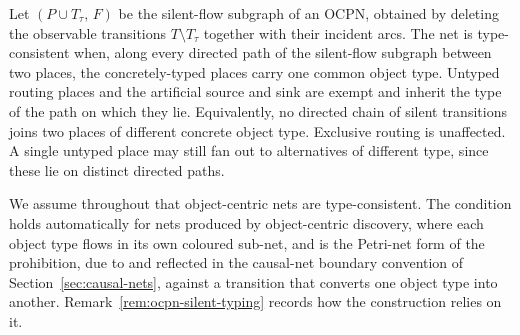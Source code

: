\begin{definition}\label{def:type-consistent}
  Let $(P\cup T_\tau,\,F)$ be the silent-flow subgraph of an OCPN,
  obtained by deleting the observable transitions $T\setminus T_\tau$ together
  with their incident arcs. The net is type-consistent when, along every
  directed path of the silent-flow subgraph between two places, the
  concretely-typed places carry one common object type. Untyped routing places
  and the artificial source and sink are exempt and inherit the type of the
  path on which they lie. Equivalently, no directed chain of silent transitions
  joins two places of different concrete object type. Exclusive routing is
  unaffected. A single untyped place may still fan out to alternatives of
  different type, since these lie on distinct directed paths.
\end{definition}

We assume throughout that object-centric nets are type-consistent. The
condition holds automatically for nets produced by object-centric discovery,
where each object type flows in its own coloured sub-net, and is the Petri-net
form of the prohibition, due to \citet{lissObjectCentricCausalNets2025} and reflected in the causal-net
boundary convention of Section~\ref{sec:causal-nets}, against a transition
that converts one object type into another. Remark~\ref{rem:ocpn-silent-typing}
records how the construction relies on it.

